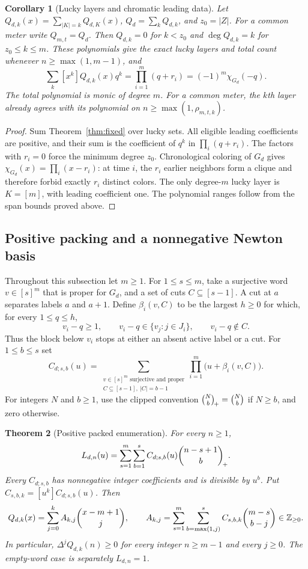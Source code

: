 \documentclass[11pt,a4paper]{article}
\newtheorem{theorem}{Theorem}[section]\newtheorem{lemma}[theorem]{Lemma}\newtheorem{corollary}[theorem]{Corollary}\newtheorem{proposition}[theorem]{Proposition}\theoremstyle{remark}\newtheorem{remark}[theorem]{Remark}\newtheorem{example}[theorem]{Example}
\begin{document}
\begin{corollary}[Lucky layers and chromatic leading data]\label{cor:leading}
Let $Q_{d,k}(x)=\sum_{|K|=k}Q_{d,K}(x)$, $Q_d=\sum_kQ_{d,k}$, and
$z_0=|Z|$. For a common meter write $Q_{m,t}=Q_d$.
Then $Q_{d,k}=0$ for $k<z_0$ and $\deg Q_{d,k}=k$ for
$z_0\le k\le m$.  These polynomials give the exact lucky layers and
total count whenever $n\ge\max(1,m-1)$, and
\[
 \sum_k[x^k]Q_{d,k}(x)q^k
       =\prod_{i=1}^m(q+r_i)=(-1)^m\chi_{G_d}(-q).
\]
The total polynomial is monic of degree $m$.  For a common meter, the
$k$th layer already agrees with its polynomial on
$n\ge\max(1,\rho_{m,t,k})$.
\end{corollary}
\begin{proof}
Sum Theorem~\ref{thm:fixed} over lucky sets.  All eligible leading
coefficients are positive, and their sum is the coefficient of $q^k$
in $\prod_i(q+r_i)$.  The factors with $r_i=0$ force the minimum
degree $z_0$.  Chronological coloring of $G_d$ gives
$\chi_{G_d}(x)=\prod_i(x-r_i)$: at time $i$, the $r_i$ earlier
neighbors form a clique and therefore forbid exactly $r_i$ distinct
colors.  The only degree-$m$ lucky layer is $K=[m]$, with leading
coefficient one.  The polynomial ranges follow from the span bounds
proved above.
\end{proof}


\subsection{Positive packing and a nonnegative Newton basis}

Throughout this subsection let $m\ge1$. For $1\le s\le m$, take a
surjective word $v\in[s]^m$ that is proper for $G_d$, and a set of cuts
$C\subseteq[s-1]$. A cut at $a$ separates labels $a$ and $a+1$.
Define $\beta_i(v,C)$ to be the largest $h\ge0$ for which, for every
$1\le q\le h$,
\[
 v_i-q\ge1,\qquad v_i-q\in\{v_j:j\in J_i\},\qquad v_i-q\notin C.
\]
Thus the block below $v_i$ stops at either an absent active label or a
cut. For $1\le b\le s$ set
\[
 C_{d;s,b}(u)=
 \sum_{\substack{v\in[s]^m\text{ surjective and proper}\\
                  C\subseteq[s-1],\ |C|=b-1}}
 \prod_{i=1}^m\bigl(u+\beta_i(v,C)\bigr).
\]
For integers $N$ and $b\ge1$, use the clipped convention
$\binom{N}{b}_{\!+}=\binom Nb$ if $N\ge b$, and zero otherwise.

\begin{theorem}[Positive packed enumeration]\label{thm:packed}
For every $n\ge1$,
\[
 L_{d,n}(u)=\sum_{s=1}^m\sum_{b=1}^s
               C_{d;s,b}(u)\binom{n-s+1}{b}_{\!+}.
\]
Every $C_{d;s,b}$ has nonnegative integer coefficients and is divisible
by $u^b$. Put $C_{s,b,k}=[u^k]C_{d;s,b}(u)$. Then
\[
 Q_{d,k}(x)=\sum_{j=0}^k A_{k,j}\binom{x-m+1}{j},\qquad
 A_{k,j}=\sum_{s=1}^m\sum_{b=\max(1,j)}^s
            C_{s,b,k}\binom{m-s}{b-j}\in\mathbb Z_{\ge0}.
\]
In particular, $\Delta^jQ_{d,k}(n)\ge0$ for every integer $n\ge m-1$
and every $j\ge0$. The empty-word case is separately $L_{d,n}=1$.
\end{theorem}
\end{document}
